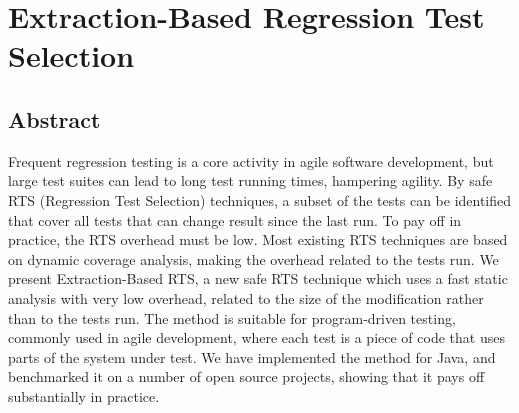 \chapter{Extraction-Based Regression Test Selection}
\label{ch:testsel}
\paperRemark{\paperIIIref}

{

\newcommand{\todo}[1]{\footnote{\textbf{TODO:} #1}}

\newcommand{\paratitle}[1]{\emph{\textbf{#1. }}}

\newcommand{\setof}[1]{\ensuremath{\left \{ \mathit{ #1 }\right \}}}
\newcommand{\tuple}[1]{\ensuremath{\left \langle \mathit{ #1 }\right \rangle }}
\newcommand{\formal}[1]{\ensuremath{\mathit{ #1} }}

\newcommand{\ourtool}{AutoRTS}



\section*{Abstract}
  Frequent regression testing is a core activity in agile software development, but large
  test suites can lead to long test running times, hampering agility.  
  By safe RTS (Regression Test Selection) techniques, a subset of the tests can be identified that cover all tests that can change result since the last run. To pay off in practice, the RTS overhead must be low. Most existing RTS techniques are based on dynamic coverage analysis, making the overhead related to the tests run. We present Extraction-Based RTS, a new safe RTS technique which uses a fast static analysis with very low overhead, related to the size of the modification rather than to the tests run.
  The method is suitable for program-driven testing, commonly used in agile development, where
  each test is a piece of code that uses parts of the system under test.
  We have implemented the method for Java, and benchmarked it on a number of
  open source projects, showing that it pays off substantially in practice.

}
